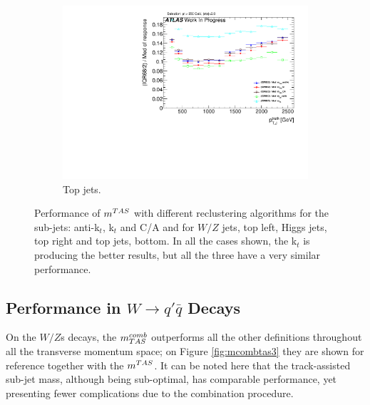 \begin{figure}
    \begin{subfigure}[b]{0.45\textwidth}
        \centering
   \includegraphics[width=\textwidth]{jet_part/mtas/71graphcftr_h_JetRatio_mJ12CALOTopsCalib.pdf}
    \caption{Top jets.}
    \label{fig:allalgotop}
    \end{subfigure}

\caption{Performance of $m^{TAS}$ with different reclustering algorithms for the sub-jets: anti-k$_t$, k$_t$ and C/A and for $W/Z$ jets, top left, Higgs jets, top right and top jets, bottom. In all the cases shown, the k$_t$ is producing the better results, but all the three have a very similar performance.}
\end{figure}


\subsection{Performance in $W \to q'\bar{q}$ Decays}
On the $W/Z$s decays, the $m^{comb}_{TAS}$ outperforms all the other definitions throughout all the transverse momentum space; on Figure \ref{fig:mcombtas3} they are shown for reference together with the $m^{TAS}$. It can be noted here that the track-assisted sub-jet mass, although being sub-optimal, has comparable performance, yet presenting fewer complications due to the combination procedure.



